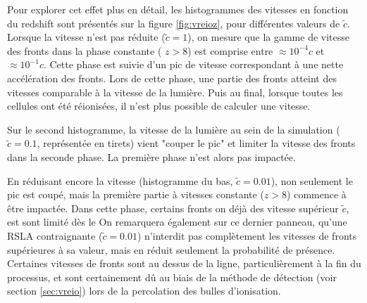 Pour explorer cet effet plus en détail, les histogrammes des vitesses en fonction du redshift sont présentés sur la figure \ref{fig:vreioz}, pour différentes valeurs de $\tilde{c}$.
Lorsque la vitesse n'est pas réduite ($\tilde{c}=1$), on mesure que la gamme de vitesse des fronts dans la phase constante ( $z>8$) est comprise entre $\approx 10^{-4}c$ et $\approx 10^{-1}c$.
Cette phase est suivie d'un pic de vitesse correspondant à une nette accélération des fronts.
Lors de cette phase, une partie des fronts atteint des vitesses comparable à la vitesse de la lumière.
Puis au final, lorsque toutes les cellules ont été réionisées, il n'est plus possible de calculer une vitesse.

Sur le second histogramme, la vitesse de la lumière au sein de la simulation ($\tilde{c}=0.1$, représentée en tirets) vient "couper le pic" et limiter la vitesse des fronts dans la seconde phase.
La première phase n'est alors pas impactée.


En réduisant encore la vitesse (histogramme du bas, $\tilde{c}=0.01$), non seulement le pic est coupé, mais la première partie à vitesses constante ($z>8$) commence à être impactée.
Dans cette phase, certains fronts on déjà des vitesse supérieur $\tilde{c}$, est sont limité dès le 
On remarquera également sur ce dernier panneau, qu'une \ac{RSLA} contraignante ($\tilde{c}=0.01$) n'interdit pas complètement les vitesses de fronts supérieures à sa valeur, mais en réduit seulement la probabilité de présence.
Certaines vitesses de fronts sont au dessus de la ligne, particulièrement à la fin du processus, et sont certainement dû au biais de la méthode de détection (voir section \ref{sec:vreio}) lors de la percolation des bulles d'ionisation.


%


